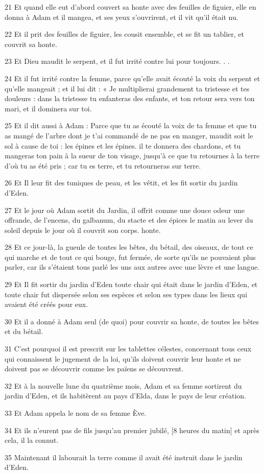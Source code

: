 \par 21 Et quand elle eut d'abord couvert sa honte avec des feuilles de figuier, elle en donna à Adam et il mangea, et ses yeux s'ouvrirent, et il vit qu'il était nu.
\par 22 Et il prit des feuilles de figuier, les cousit ensemble, et se fit un tablier, et couvrit sa honte.
\par 23 Et Dieu maudit le serpent, et il fut irrité contre lui pour toujours. . .
\par 24 Et il fut irrité contre la femme, parce qu'elle avait écouté la voix du serpent et qu'elle mangeait ; et il lui dit : « Je multiplierai grandement ta tristesse et tes douleurs : dans la tristesse tu enfanteras des enfants, et ton retour sera vers ton mari, et il dominera sur toi.
\par 25 Et il dit aussi à Adam : Parce que tu as écouté la voix de ta femme et que tu as mangé de l'arbre dont je t'ai commandé de ne pas en manger, maudit soit le sol à cause de toi : les épines et les épines. il te donnera des chardons, et tu mangeras ton pain à la sueur de ton visage, jusqu'à ce que tu retournes à la terre d'où tu as été pris ; car tu es terre, et tu retourneras sur terre.
\par 26 Et Il leur fit des tuniques de peau, et les vêtit, et les fit sortir du jardin d'Eden.
\par 27 Et le jour où Adam sortit du Jardin, il offrit comme une douce odeur une offrande, de l'encens, du galbanum, du stacte et des épices le matin au lever du soleil depuis le jour où il couvrit son corps. honte.
\par 28 Et ce jour-là, la gueule de toutes les bêtes, du bétail, des oiseaux, de tout ce qui marche et de tout ce qui bouge, fut fermée, de sorte qu'ils ne pouvaient plus parler, car ils s'étaient tous parlé les uns aux autres avec une lèvre et une langue.
\par 29 Et Il fit sortir du jardin d'Eden toute chair qui était dans le jardin d'Eden, et toute chair fut dispersée selon ses espèces et selon ses types dans les lieux qui avaient été créés pour eux.
\par 30 Et il a donné à Adam seul (de quoi) pour couvrir sa honte, de toutes les bêtes et du bétail.
\par 31 C'est pourquoi il est prescrit sur les tablettes célestes, concernant tous ceux qui connaissent le jugement de la loi, qu'ils doivent couvrir leur honte et ne doivent pas se découvrir comme les païens se découvrent.
\par 32 Et à la nouvelle lune du quatrième mois, Adam et sa femme sortirent du jardin d'Eden, et ils habitèrent au pays d'Elda, dans le pays de leur création.
\par 33 Et Adam appela le nom de sa femme Ève.
\par 34 Et ils n'eurent pas de fils jusqu'au premier jubilé, [8 heures du matin] et après cela, il la connut.
\par 35 Maintenant il labourait la terre comme il avait été instruit dans le jardin d'Eden.

